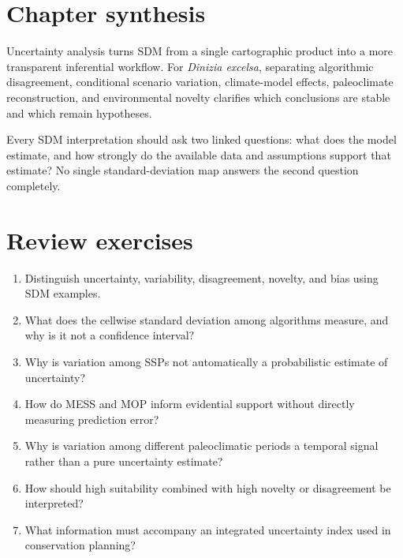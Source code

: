 \section{Chapter synthesis}

Uncertainty analysis turns SDM from a single cartographic product into a more transparent inferential workflow. For \textit{Dinizia excelsa}, separating algorithmic disagreement, conditional scenario variation, climate-model effects, paleoclimate reconstruction, and environmental novelty clarifies which conclusions are stable and which remain hypotheses.

\begin{conceito}[title={\faBook\quad Key message}]
Every SDM interpretation should ask two linked questions: what does the model estimate, and how strongly do the available data and assumptions support that estimate? No single standard-deviation map answers the second question completely.
\end{conceito}

\section{Review exercises}

\begin{enumerate}
\item Distinguish uncertainty, variability, disagreement, novelty, and bias using SDM examples.
\item What does the cellwise standard deviation among algorithms measure, and why is it not a confidence interval?
\item Why is variation among SSPs not automatically a probabilistic estimate of uncertainty?
\item How do MESS and MOP inform evidential support without directly measuring prediction error?
\item Why is variation among different paleoclimatic periods a temporal signal rather than a pure uncertainty estimate?
\item How should high suitability combined with high novelty or disagreement be interpreted?
\item What information must accompany an integrated uncertainty index used in conservation planning?
\end{enumerate}

